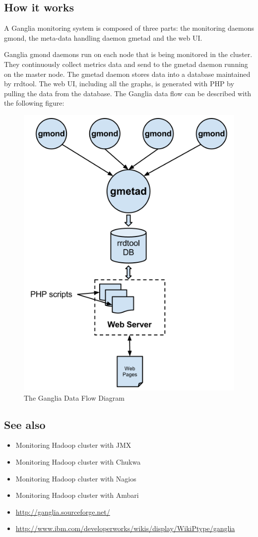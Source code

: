 \subsection*{How it works}
A Ganglia monitoring system is composed of three parts: the monitoring daemons gmond, the meta-data handling daemon gmetad and the web UI.

Ganglia gmond daemons run on each node that is being monitored in the cluster. They continuously collect metrics data and send to the gmetad daemon running on the master node. The gmetad daemon stores data into a database maintained by rrdtool. The web UI, including all the graphs, is generated with PHP by pulling the data from the database. The Ganglia data flow can be described with the following figure:
\begin{figure}[ht]
  \centering
  \includegraphics[width=.6\textwidth]{figs/5163os_06_13.png}
  \caption{The Ganglia Data Flow Diagram}\label{fig:ganglia.dataflow}
\end{figure} 
\subsection*{See also}
\begin{itemize}
  \item Monitoring Hadoop cluster with JMX
  \item Monitoring Hadoop cluster with Chukwa
  \item Monitoring Hadoop cluster with Nagios
  \item Monitoring Hadoop cluster with Ambari
  \item \url{http://ganglia.sourceforge.net/}
  \item \url{http://www.ibm.com/developerworks/wikis/display/WikiPtype/ganglia}
\end{itemize}
